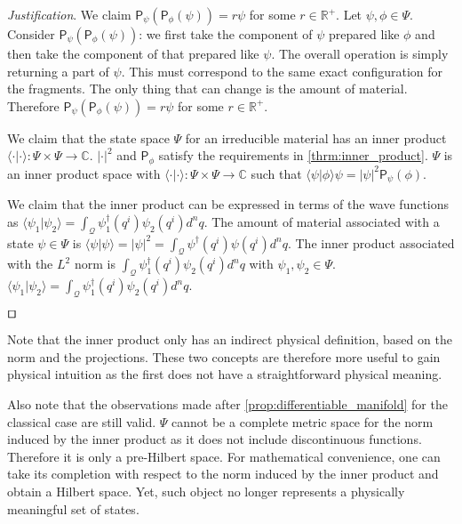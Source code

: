 \documentclass[smallextended]{svjour3}
\numberwithin{equation}{section}
\newenvironment{justification}{\emph{Justification}.}{\hfill\(\qed\)}
\theoremstyle{definition}
\newenvironment{justification}{\emph{Justification}.}{\qed}
\begin{document}
\begin{justification}
	We claim $\mathsf{P}_{\psi} (\mathsf{P}_{\phi} (\psi)) = r \psi$ for some $r \in \mathbb{R}^+$. Let $\psi, \phi \in \Psi$. Consider $\mathsf{P}_{\psi} (\mathsf{P}_{\phi} (\psi))$: we first take the component of $\psi$ prepared like $\phi$ and then take the component of that prepared like $\psi$. The overall operation is simply returning a part of $\psi$. This must correspond to the same exact configuration for the fragments. The only thing that can change is the amount of material. Therefore $\mathsf{P}_{\psi} (\mathsf{P}_{\phi} (\psi)) = r \psi$ for some $r \in \mathbb{R}^+$.
	
	We claim that the state space $\Psi$ for an irreducible material has an inner product $\langle \cdot |\cdot \rangle : \Psi \times \Psi \rightarrow \mathbb{C}$. $| \cdot | ^2$ and $\mathsf{P}_{\phi}$ satisfy the requirements in \ref{thrm:inner_product}. $\Psi$ is an inner product space with $\langle \cdot |\cdot \rangle : \Psi \times \Psi \rightarrow \mathbb{C}$ such that $\langle \psi |\phi \rangle \psi = | \psi | ^2\mathsf{P}_{\psi}(\phi)$.
	
	We claim that the inner product can be expressed in terms of the wave functions as $\langle \psi_1 | \psi_2 \rangle = \int_\mathcal{Q} \psi_1^\dagger (q^i) \psi_2(q^i) d^nq$. The amount of material associated with a state $\psi \in \Psi$ is $\langle \psi | \psi \rangle = | \psi |^2 = \int_\mathcal{Q} \psi^\dagger (q^i) \psi(q^i) d^nq$. The inner product associated with the $L^2$ norm is $\int_\mathcal{Q} \psi_1^\dagger (q^i) \psi_2(q^i) d^nq$ with $\psi_1, \psi_2 \in \Psi$. $\langle \psi_1 | \psi_2 \rangle = \int_\mathcal{Q} \psi_1^\dagger (q^i) \psi_2(q^i) d^nq$.
	
\end{justification}

Note that the inner product only has an indirect physical definition, based on the norm and the projections. These two concepts are therefore more useful to gain physical intuition as the first does not have a straightforward physical meaning.

Also note that the observations made after \ref{prop:differentiable_manifold} for the  classical case are still valid. $\Psi$ cannot be a complete metric space for the norm induced by the inner product as it does not include discontinuous functions. Therefore it is only a pre-Hilbert space. For mathematical convenience, one can take its completion with respect to the norm induced by the inner product and obtain a Hilbert space. Yet, such object no longer represents a physically meaningful set of states.
\end{document}
